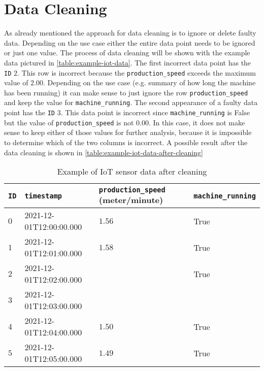 \section{Data Cleaning}
As already mentioned the approach for data cleaning is to ignore or delete faulty data. Depending on the use case either the entire data point needs to be ignored or just one value. The process of data cleaning will be shown with the example data pictured in \autoref{table:example-iot-data}.
The first incorrect data point has the \verb|ID| $2$. This row is incorrect because the \verb|production_speed| exceeds the maximum value of $2.00$. Depending on the use case (e.g. summary of how long the machine has been running) it can make sense to just ignore the row \verb|production_speed| and keep the value for \verb|machine_running|. The second appearance of a faulty data point has the \verb|ID| $3$. This data point is incorrect since \verb|machine_running| is False but the value of \verb|production_speed| is not $0.00$. In this case, it does not make sense to keep either of those values for further analysis, because it is impossible to determine which of the two columns is incorrect. A possible result after the data cleaning is shown in \autoref{table:example-iot-data-after-cleaning}
\begin{table}[H]
\begin{tabular}{|l|l|l|l|}
\hline
\verb|ID| & \verb|timestamp|        & \verb|production_speed| (meter/minute) & \verb|machine_running| \\ \hline
$0$       & 2021-12-01T12:00:00.000 & $1.56$                                 & True                   \\ \hline
$1$       & 2021-12-01T12:01:00.000 & $1.58$                                 & True                   \\ \hline
$2$       & 2021-12-01T12:02:00.000 &                                        & True                   \\ \hline
$3$       & 2021-12-01T12:03:00.000 &                                        &                        \\ \hline
$4$       & 2021-12-01T12:04:00.000 & $1.50$                                 & True                   \\ \hline
$5$       & 2021-12-01T12:05:00.000 & $1.49$                                 & True                   \\ \hline
\end{tabular}
\caption{Example of IoT sensor data after cleaning}
\label{table:example-iot-data-after-cleaning}
\end{table}
